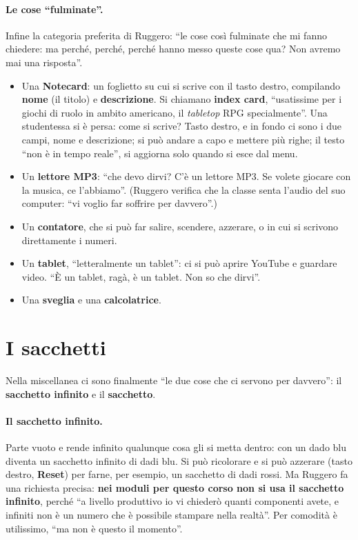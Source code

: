 \paragraph{Le cose ``fulminate''.} Infine la categoria preferita di Ruggero: ``le cose
così fulminate che mi fanno chiedere: ma perché, perché, perché hanno messo queste
cose qua? Non avremo mai una risposta''.
\begin{itemize}
  \item Una \textbf{Notecard}: un foglietto su cui si scrive con il tasto destro,
        compilando \textbf{nome} (il titolo) e \textbf{descrizione}. Si chiamano
        \textbf{index card}, ``usatissime per i giochi di ruolo in ambito americano,
        il \emph{tabletop} RPG specialmente''. Una studentessa si è persa: come si
        scrive? Tasto destro, e in fondo ci sono i due campi, nome e descrizione; si
        può andare a capo e mettere più righe; il testo ``non è in tempo reale'', si
        aggiorna solo quando si esce dal menu.
  \item Un \textbf{lettore MP3}: ``che devo dirvi? C'è un lettore MP3. Se volete
        giocare con la musica, ce l'abbiamo''. (Ruggero verifica che la classe senta
        l'audio del suo computer: ``vi voglio far soffrire per davvero''.)
  \item Un \textbf{contatore}, che si può far salire, scendere, azzerare, o in cui si
        scrivono direttamente i numeri.
  \item Un \textbf{tablet}, ``letteralmente un tablet'': ci si può aprire YouTube e
        guardare video. ``È un tablet, ragà, è un tablet. Non so che dirvi''.
  \item Una \textbf{sveglia} e una \textbf{calcolatrice}.
\end{itemize}

\section{I sacchetti}
\label{a8:sec:sacchetti}

Nella miscellanea ci sono finalmente ``le due cose che ci servono per davvero'': il
\textbf{sacchetto infinito} e il \textbf{sacchetto}.

\paragraph{Il sacchetto infinito.} Parte vuoto e rende infinito qualunque cosa gli si
metta dentro: con un dado blu diventa un sacchetto infinito di dadi blu. Si può
ricolorare e si può azzerare (tasto destro, \textbf{Reset}) per farne, per esempio, un
sacchetto di dadi rossi. Ma Ruggero fa una richiesta precisa: \textbf{nei moduli per
questo corso non si usa il sacchetto infinito}, perché ``a livello produttivo io vi
chiederò quanti componenti avete, e infiniti non è un numero che è possibile stampare
nella realtà''. Per comodità è utilissimo, ``ma non è questo il momento''.

